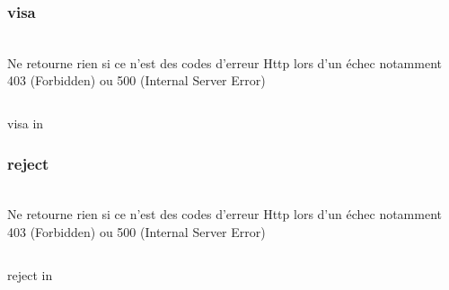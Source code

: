 \subsubsection{visa}
\\

Ne retourne rien si ce n'est des codes d'erreur Http lors d'un échec notamment 403 (Forbidden) ou 500 (Internal Server Error)

\begin{codesnippet}
\inputminted[frame=single,linenos,fontsize=\footnotesize]{javascript}{extraits/visa_in.js}
\caption{visa in}
\label{snip:visa_in}
\end{codesnippet}

\subsubsection{reject}
\\

Ne retourne rien si ce n'est des codes d'erreur Http lors d'un échec notamment 403 (Forbidden) ou 500 (Internal Server Error)

\begin{codesnippet}
\inputminted[frame=single,linenos,fontsize=\footnotesize]{javascript}{extraits/reject_in.js}
\caption{reject in}
\label{snip:reject_in}
\end{codesnippet}
